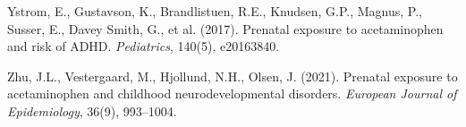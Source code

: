 \documentclass[12pt]{article}
\begin{document}
\begin{thebibliography}{99}
Ystrom, E., Gustavson, K., Brandlistuen, R.E., Knudsen, G.P., Magnus, P., Susser, E., Davey Smith, G., et al. (2017).
Prenatal exposure to acetaminophen and risk of ADHD.
\textit{Pediatrics}, 140(5), e20163840.

Zhu, J.L., Vestergaard, M., Hjollund, N.H., Olsen, J. (2021).
Prenatal exposure to acetaminophen and childhood neurodevelopmental disorders.
\textit{European Journal of Epidemiology}, 36(9), 993--1004.


















\end{thebibliography}
\end{document}
